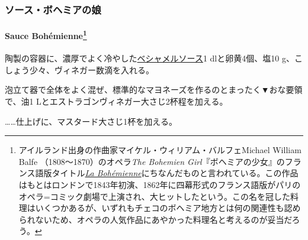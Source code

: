 \begin{recette}
\hypertarget{ux30bdux30fcux30b9ux30dcux30d8ux30dfux30a2ux306eux5a18}{%
\subsubsection{ソース・ボヘミアの娘}\label{ux30bdux30fcux30b9ux30dcux30d8ux30dfux30a2ux306eux5a18}}

\hypertarget{sauce-bohemienne}{%
\paragraph[Sauce Bohémienne]{\texorpdfstring{Sauce Bohémienne\footnote{アイルランド出身の作曲家マイケル・ウィリアム・バルフェMichael
  William Balfe （1808〜1870）のオペラ\emph{The Bohemien
  Girl}『ボヘミアの少女』のフランス語版タイトル\href{https://archive.org/details/labohmiennegrand00balf}{\emph{La
  Bohémienne}}にちなんだものと言われている。この作品はもとはロンドンで1843年初演、1862年に四幕形式のフランス語版がパリのオペラ=コミック劇場で上演され、大ヒットしたという。この名を冠した料理はいくつかあるが、いずれもチェコのボヘミア地方とは何の関連性も認められないため、オペラの人気作品にあやかった料理名と考えるのが妥当だろう。}}{Sauce Bohémienne}}\label{sauce-bohemienne}}


陶製の容器に、濃厚でよく冷やした\protect\hyperlink{sauce-bechamel}{ベシャメルソース}1\undemi{}
dlと卵黄4個、塩10 g、こしょう少々、ヴィネガー数滴を入れる。

泡立て器で全体をよく混ぜ、標準的なマヨネーズを作るのとまったく▼おな要領で、油1
Lとエストラゴンヴィネガー大さじ2杯程を加える。

\ldots{}\ldots{}仕上げに、マスタード大さじ1杯を加える。
\end{recette}